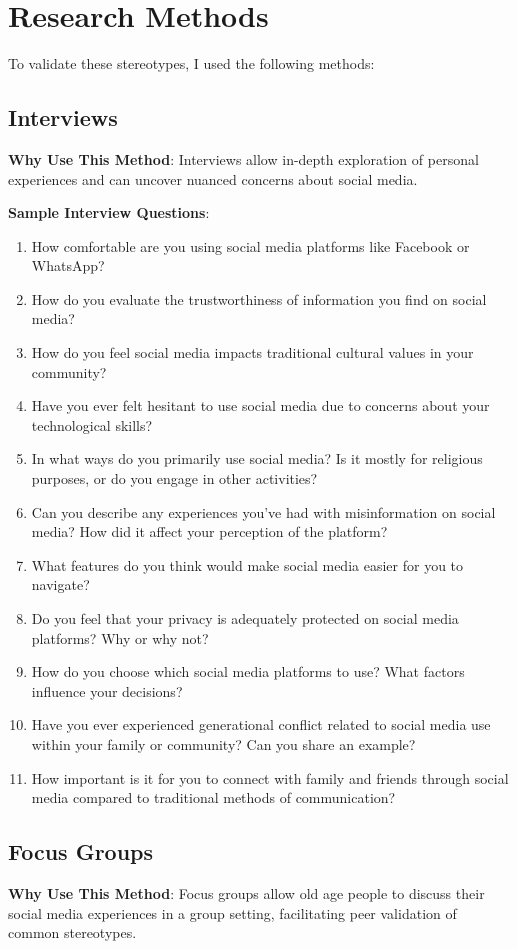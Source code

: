 \documentclass[a4paper,12pt]{article}
\begin{document}
\section{Research Methods}

To validate these stereotypes, I used the following methods:

\subsection{Interviews}
\textbf{Why Use This Method}: Interviews allow in-depth exploration of personal experiences and can uncover nuanced concerns about social media.


\textbf{Sample Interview Questions}:
\begin{enumerate} 
\item How comfortable are you using social media platforms like Facebook or WhatsApp?
\item How do you evaluate the trustworthiness of information you find on social media?
\item How do you feel social media impacts traditional cultural values in your community? 
\item Have you ever felt hesitant to use social media due to concerns about your technological skills? 
\item In what ways do you primarily use social media? Is it mostly for religious purposes, or do you engage in other activities? 
\item Can you describe any experiences you've had with misinformation on social media? How did it affect your perception of the platform? 
\item What features do you think would make social media easier for you to navigate? 
\item Do you feel that your privacy is adequately protected on social media platforms? Why or why not? \item How do you choose which social media platforms to use? What factors influence your decisions? 
\item Have you ever experienced generational conflict related to social media use within your family or community? Can you share an example? 
\item How important is it for you to connect with family and friends through social media compared to traditional methods of communication? 
\end{enumerate}

\subsection{Focus Groups}
\textbf{Why Use This Method}: Focus groups allow old age people to discuss their social media experiences in a group setting, facilitating peer validation of common stereotypes.
\end{document}
